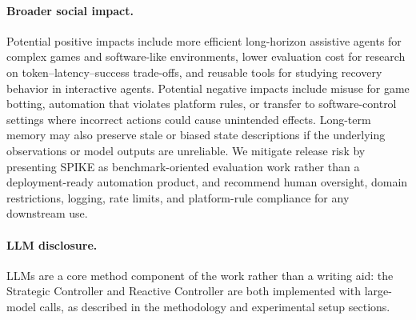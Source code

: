 \paragraph{Broader social impact.}
\label{sec:appendix_broader_social_impact}
Potential positive impacts include more efficient long-horizon assistive agents
for complex games and software-like environments, lower evaluation cost for
research on token--latency--success trade-offs, and reusable tools for studying
recovery behavior in interactive agents. Potential negative impacts include
misuse for game botting, automation that violates platform rules, or transfer to
software-control settings where incorrect actions could cause unintended
effects. Long-term memory may also preserve stale or biased state descriptions
if the underlying observations or model outputs are unreliable. We mitigate
release risk by presenting SPIKE as benchmark-oriented evaluation work rather
than a deployment-ready automation product, and recommend human oversight,
domain restrictions, logging, rate limits, and platform-rule compliance for any
downstream use.

\paragraph{LLM disclosure.}
\label{sec:appendix_llm_disclosure}
LLMs are a core method component of the work rather than a writing aid: the
Strategic Controller and Reactive Controller are both implemented with
large-model calls, as described in the methodology and experimental setup
sections.
